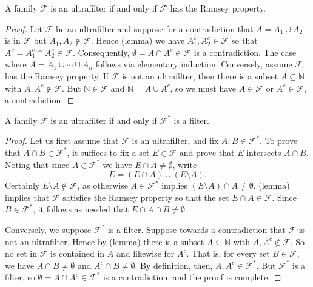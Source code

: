 \begin{lemma}
A family \( \mathcal{F}  \) is an ultrafilter if and only if \( \mathcal{F}  \) has the Ramsey property.
\end{lemma}
\begin{proof}
	Let \( \mathcal{F}  \) be an ultrafilter and suppose for a contradiction that \( A = A_1 \cup A_2 \) is in \( \mathcal{F}\) but \( A_1, A_2 \notin \mathcal{F}  \). Hence (lemma) we have \( A_1^{c} , A_2^{c} \in \mathcal{F}  \) so that \( A^{c} = A_1^{c} \cap A_2^{c} \in \mathcal{F}  \). Consequently, \( \emptyset = A \cap A^{c} \in \mathcal{F}  \) is a contradiction. The case where \( A = A_1 \cup \cdots \cup A_{n}  \) follows via elementary induction. Conversely, assume \( \mathcal{F}  \) has the Ramsey property. If \( \mathcal{F}  \) is not an ultrafilter, then there is a subset \( A \subseteq \mathbb{N}  \) with \( A, A^{c} \notin \mathcal{F}  \). But \( \mathbb{N} \in \mathcal{F}  \) and \( \mathbb{N} = A \cup A^{c}  \), so we must have \( A \in \mathcal{F}  \) or \( A^{c} \in \mathcal{F}  \), a contradiction.
\end{proof}
\begin{proposition}
A family \( \mathcal{F}  \) is an ultrafilter if and only if \( \mathcal{F} ^{\ast}  \) is a filter.
\end{proposition}
\begin{proof}
Let us first assume that \( \mathcal{F}  \) is an ultrafilter, and fix \( A,B \in \mathcal{F} ^{\ast}  \). To prove that \( A \cap B \in \mathcal{F} ^{\ast}  \), it suffices to fix a set \( E \in \mathcal{F}  \) and prove that \( E \) intersects \( A \cap B \). Noting that since \( A \in \mathcal{F} ^{\ast}  \) we have \( E \cap A \neq \emptyset  \), write \[ E = (E \cap A) \cup (E \setminus A). \] Certainly \( E \setminus A \notin \mathcal{F}  \), as otherwise \( A \in \mathcal{F} ^{\ast}  \) implies \( (E\setminus A) \cap A \neq \emptyset \). (lemma) implies that \( \mathcal{F}  \) satisfies the Ramsey property so that the set \( E \cap A \in \mathcal{F}  \). Since \( B \in \mathcal{F} ^{\ast}  \), it follows as needed that \( E \cap A \cap B \neq \emptyset  \).

Conversely, we suppose \( \mathcal{F} ^{\ast}  \) is a filter. Suppose towards a contradiction that \( \mathcal{F}  \) is not an ultrafilter. Hence by (lemma) there is a subset \( A \subseteq \mathbb{N}  \) with \( A, A^{c} \notin \mathcal{F}  \). So no set in \( \mathcal{F}  \) is contained in \( A \) and likewise for \( A^{c}  \). That is, for every set \( B \in \mathcal{F}  \), we have \( A \cap B \neq \emptyset  \) and \( A^{c} \cap B \neq \emptyset  \). By definition, then, \( A, A^{c} \in \mathcal{F}^{\ast}   \). But \( \mathcal{F} ^{\ast}  \) is a filter, so \( \emptyset = A \cap A^{c} \in \mathcal{F} ^{\ast}  \) is a contradiction, and the proof is complete.
\end{proof}

